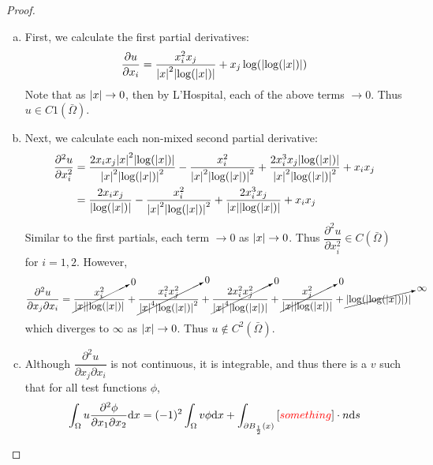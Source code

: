 \documentclass{article} %
\theoremstyle{plain}
\numberwithin{equation}{section} %
\numberwithin{figure}{section} %
\numberwithin{table}{section} %
\begin{document}
\begin{proof}
    \begin{enumerate}[(a)]
        \item First, we calculate the first partial derivatives:
        \begin{align*}
            \frac{\partial u}{\partial x_i} = \frac{x_i^2 x_j}{\abs{x}^2\abs{\log(\abs{x})}} + x_j \log(\abs{\log(\abs{x})})
        \end{align*}
        Note that as $\abs{x} \rightarrow 0$, then by L'Hospital, each of the above terms $\rightarrow 0$.  Thus $u \in C1(\bar{\Omega})$.
        \item Next, we calculate each non-mixed second partial derivative:
        \begin{align*}
            \frac{\partial^2 u}{\partial x_i^2} &= \frac{2x_ix_j\abs{x}^2\abs{\log(\abs{x})}}{\abs{x}^2\abs{\log(\abs{x})}^2} - \frac{x_i^2}{\abs{x}^2\abs{\log(\abs{x})}^2} + \frac{2x_i^3x_j\abs{\log(\abs{x})}}{\abs{x}^2\abs{\log(\abs{x})}^2} + x_ix_j \\
            &= \frac{2x_ix_j}{\abs{\log(\abs{x})}} - \frac{x_i^2}{\abs{x}^2\abs{\log(\abs{x})}^2} + \frac{2x_i^3x_j}{\abs{x}\abs{\log(\abs{x})}} + x_ix_j
        \end{align*}
        Similar to the first partials, each term $\rightarrow 0$ as $\abs{x} \rightarrow 0$.  Thus $\dfrac{\partial^2 u}{\partial x_i^2} \in C(\bar{\Omega})$ for $i = 1, 2$.  However,
        \begin{align*}
            \frac{\partial^2 u}{\partial x_j \partial x_i} &= \cancelto{0}{\frac{x_i^2}{\abs{x}\abs{\log(\abs{x})}}} + \cancelto{0}{\frac{x_i^2x_j^2}{\abs{x}^4\abs{\log(\abs{x})}^2}} + \cancelto{0}{\frac{2x_i^2x_j^2}{\abs{x}^4\abs{\log(\abs{x})}}} + \cancelto{0}{\frac{x_j^2}{\abs{x}\abs{\log(\abs{x})}}} + \cancelto{\infty}{\abs{\log(\abs{\log(\abs{x})})}}
        \end{align*}
        which diverges to $\infty$ as $\abs{x} \rightarrow 0$.  Thus $u \not\in C^2(\bar{\Omega})$.
        \item Although $\dfrac{\partial^2 u}{\partial x_j \partial x_i}$ is not continuous, it is integrable, and thus there is a $v$ such that for all test functions $\phi$,
        \begin{align*}
            \int_{\Omega} u \frac{\partial^2 \phi}{\partial x_1 \partial x_2} \dd x = (-1)^2 \int_\Omega v \phi \dd x + \int_{\partial B_{\frac{1}{2}}(x)}\qty[{\color{red} something} ]\cdot n \dd s
        \end{align*}
    \end{enumerate}
\end{proof}
\end{document}
